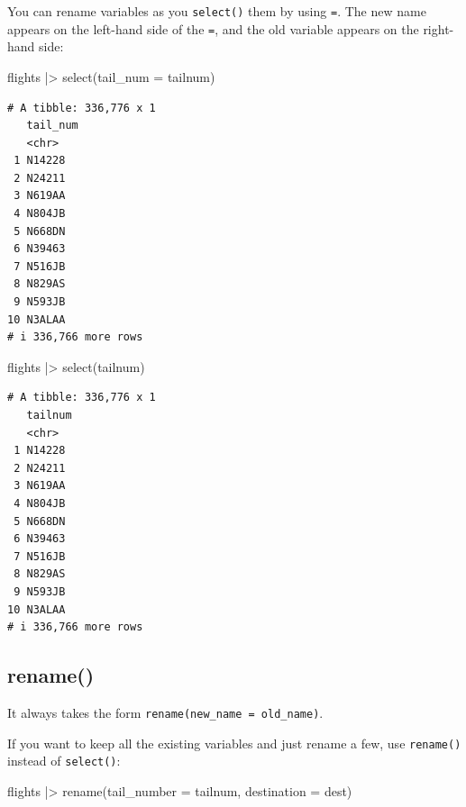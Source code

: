 \documentclass[
  letterpaper,
  DIV=11,
  numbers=noendperiod]{scrreprt}
\newenvironment{Shaded}{\begin{snugshade}}{\end{snugshade}}
\newcommand{\AttributeTok}[1]{\textcolor[rgb]{0.40,0.45,0.13}{#1}}
\newcommand{\FunctionTok}[1]{\textcolor[rgb]{0.28,0.35,0.67}{#1}}
\newcommand{\NormalTok}[1]{\textcolor[rgb]{0.00,0.23,0.31}{#1}}
\newcommand{\SpecialCharTok}[1]{\textcolor[rgb]{0.37,0.37,0.37}{#1}}
\begin{document}
You can rename variables as you \texttt{select()} them by using
\texttt{=}. The new name appears on the left-hand side of the
\texttt{=}, and the old variable appears on the right-hand side:

\begin{Shaded}
\begin{Highlighting}[]
\NormalTok{flights }\SpecialCharTok{|\textgreater{}}
  \FunctionTok{select}\NormalTok{(}\AttributeTok{tail\_num =}\NormalTok{ tailnum)}
\end{Highlighting}
\end{Shaded}

\begin{verbatim}
# A tibble: 336,776 x 1
   tail_num
   <chr>   
 1 N14228  
 2 N24211  
 3 N619AA  
 4 N804JB  
 5 N668DN  
 6 N39463  
 7 N516JB  
 8 N829AS  
 9 N593JB  
10 N3ALAA  
# i 336,766 more rows
\end{verbatim}

\begin{Shaded}
\begin{Highlighting}[]
\NormalTok{flights }\SpecialCharTok{|\textgreater{}}
  \FunctionTok{select}\NormalTok{(tailnum)}
\end{Highlighting}
\end{Shaded}

\begin{verbatim}
# A tibble: 336,776 x 1
   tailnum
   <chr>  
 1 N14228 
 2 N24211 
 3 N619AA 
 4 N804JB 
 5 N668DN 
 6 N39463 
 7 N516JB 
 8 N829AS 
 9 N593JB 
10 N3ALAA 
# i 336,766 more rows
\end{verbatim}

\subsection{rename()}\label{rename}

It always takes the form \texttt{rename(new\_name\ =\ old\_name)}.

If you want to keep all the existing variables and just rename a few,
use \texttt{rename()} instead of \texttt{select()}:

\begin{Shaded}
\begin{Highlighting}[]
\NormalTok{flights }\SpecialCharTok{|\textgreater{}}
  \FunctionTok{rename}\NormalTok{(}\AttributeTok{tail\_number =}\NormalTok{ tailnum,}
         \AttributeTok{destination =}\NormalTok{ dest)}
\end{Highlighting}
\end{Shaded}
\end{document}
